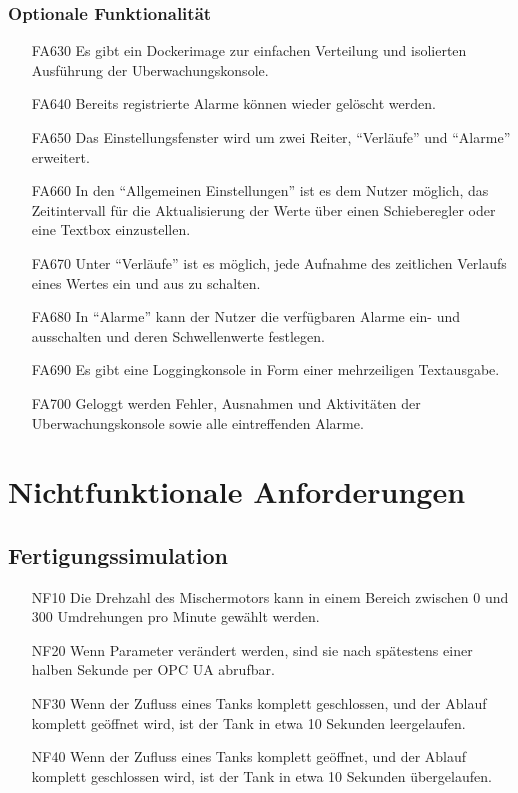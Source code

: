 \documentclass[parskip=full]{scrartcl}
\begin{document}
\subsubsection{Optionale Funktionalität}
\label{konsole-optional}
\begin{enumerate}
\item[FA630] Es gibt ein \gls{Dockerimage} zur einfachen Verteilung und isolierten Ausführung der \gls{Uberwachungskonsole}.
\item[FA640] Bereits registrierte Alarme können wieder gelöscht werden.
\item[FA650] Das Einstellungsfenster wird um zwei Reiter, "`Verläufe"' und "`Alarme"' erweitert.
\item[FA660] In den "`Allgemeinen Einstellungen"' ist es dem Nutzer möglich, das Zeitintervall für die Aktualisierung der Werte über einen Schieberegler oder eine Textbox einzustellen.
\item[FA670] Unter "`Verläufe"' ist es möglich, jede Aufnahme des zeitlichen Verlaufs eines Wertes ein und aus zu schalten.
\item[FA680] In "`Alarme"' kann der Nutzer die verfügbaren Alarme ein- und ausschalten und deren Schwellenwerte festlegen.
\item[FA690] Es gibt eine Loggingkonsole in Form einer mehrzeiligen Textausgabe.
\item[FA700] Geloggt werden Fehler, Ausnahmen und Aktivitäten der \gls{Uberwachungskonsole} sowie alle eintreffenden Alarme.
\end{enumerate}

\pagebreak
\section{Nichtfunktionale Anforderungen}
\subsection{Fertigungssimulation}
\begin{enumerate}
 \item[NF10] Die Drehzahl des Mischermotors kann in einem Bereich zwischen 0 und 300 Umdrehungen pro Minute gewählt werden.
 \item[NF20] Wenn Parameter verändert werden, sind sie nach spätestens einer halben Sekunde per OPC UA abrufbar.
 \item[NF30] Wenn der Zufluss eines Tanks komplett geschlossen, und der Ablauf komplett geöffnet wird, ist der Tank in etwa 10 Sekunden leergelaufen.
 \item[NF40] Wenn der Zufluss eines Tanks komplett geöffnet, und der Ablauf komplett geschlossen wird, ist der Tank in etwa 10 Sekunden übergelaufen.
\end{enumerate}
\end{document}
